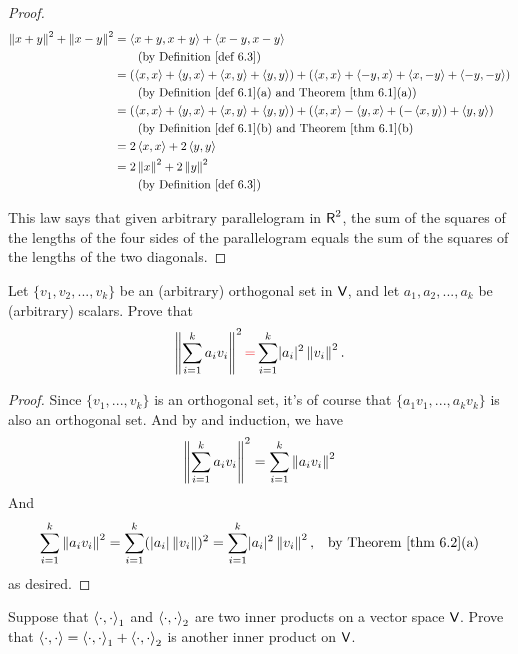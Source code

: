 \begin{proof}
\begin{align*}
    \norm{x + y}^2 + \norm{x - y}^2
    & = \LG x + y, x + y \RG + \LG x - y, x - y \RG \\
    & \quad \quad \text{(by \DEF{6.3})} \\
    & = (\LG x, x \RG + \LG y, x \RG + \LG x, y \RG + \LG y, y \RG) + (\LG x, x \RG + \LG -y, x \RG + \LG x, -y \RG + \LG -y, -y \RG) \\
    & \quad \quad \text{(by \DEF{6.1}(a) and \THM{6.1}(a))} \\
    & = (\LG x, x \RG + \LG y, x \RG + \LG x, y \RG + \LG y, y \RG) + (\LG x, x \RG - \LG y, x \RG + (-\LG x, y \RG) + \LG y, y \RG) \\
    & \quad \quad \text{(by \DEF{6.1}(b) and \THM{6.1}(b)} \\
    & = 2 \LG x, x \RG + 2 \LG y, y \RG \\
    & = 2 \norm{x}^2 + 2 \norm{y}^2 \\
    & \quad \quad \text{(by \DEF{6.3})}
\end{align*}

This law says that given arbitrary parallelogram in \(\textsf{R}^2\), the sum of the squares of the lengths of the four sides of the parallelogram equals the sum of the squares of the lengths of the two diagonals.
\end{proof}

\begin{exercise} \label{exercise 6.1.12}
Let \(\{ v_1, v_2, ..., v_k \}\) be an (arbitrary) orthogonal set in \(\textsf{V}\), and let \(a_1, a_2, ..., a_k\) be (arbitrary) scalars.
Prove that
\[
    \norm{\sum_{i = 1}^k a_i v_i}^2 \RED{=} \sum_{i = 1}^k \abs{a_i}^2 \norm{v_i}^2.
\]
\end{exercise}

\begin{proof}
Since \(\{ v_1, ..., v_k \}\) is an orthogonal set, it's of course that \(\{ a_1 v_1, ..., a_k v_k \}\) is also an orthogonal set.
And by  and induction, we have
\[
    \left\lVert\sum_{i = 1}^k a_i v_i\right\rVert^2 = \sum_{i = 1}^k \left\lVert a_i v_i \right\rVert^2
\]
And
\begin{align*}
    \sum_{i = 1}^k \norm{ a_i v_i }^2 & = \sum_{i = 1}^k (\abs{a_i} \norm{v_i})^2
    = \sum_{i = 1}^k \abs{a_i}^2 \norm{v_i}^2, & \text{by \THM{6.2}(a)}
\end{align*}
as desired.
\end{proof}

\begin{exercise} \label{exercise 6.1.13}
Suppose that \(\left< \cdot, \cdot \right>_1\) and \(\left< \cdot, \cdot \right>_2\) are two inner products on a vector space \(\textsf{V}\).
Prove that \(\left< \cdot, \cdot \right> = \left< \cdot, \cdot \right>_1 + \left< \cdot, \cdot \right>_2\) is another inner product on \(\textsf{V}\).
\end{exercise}


